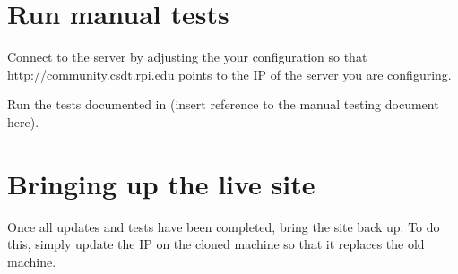 \documentclass{article}
\begin{document}
\section{Run manual tests}

Connect to the server by adjusting the your configuration so that \url{http://community.csdt.rpi.edu} points to the IP of the server you are configuring.

Run the tests documented in (insert reference to the manual testing document here).

\section{Bringing up the live site}

Once all updates and tests have been completed, bring the site back up.
To do this, simply update the IP on the cloned machine so that it replaces the old machine.






\end{document}
